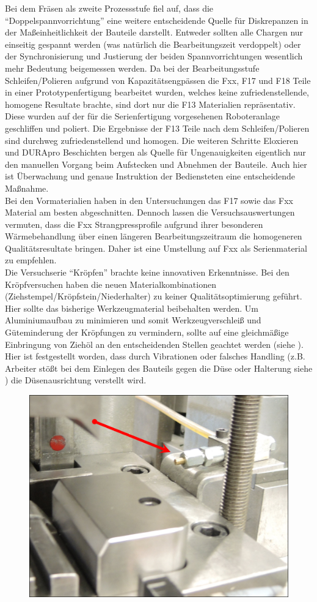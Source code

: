 \documentclass[12pt,a4paper,parskip,twoside,BCOR5mm,headsepline]{scrartcl}
\begin{document}
\begin{description*}
\begin{itemize*}
Bei dem Fräsen als zweite Prozessstufe fiel auf, dass die "`Doppelspannvorrichtung"' eine weitere entscheidende Quelle für Diskrepanzen in der Maßeinheitlichkeit der Bauteile darstellt. Entweder sollten  alle Chargen nur einseitig gespannt werden (was natürlich die Bearbeitungszeit verdoppelt) oder der Synchronisierung und Justierung der beiden Spannvorrichtungen wesentlich mehr Bedeutung  beigemessen  werden. 
Da bei der Bearbeitungsstufe Schleifen/Polieren aufgrund von Kapazitätsengpässen die Fxx, F17 und F18 Teile in einer Prototypenfertigung bearbeitet wurden, welches keine zufriedenstellende, homogene Resultate brachte, sind dort nur die F13 Materialien repräsentativ. Diese wurden auf der für die Serienfertigung vorgesehenen Roboteranlage geschliffen und poliert. Die Ergebnisse der F13 Teile nach dem Schleifen/Polieren sind durchweg zufriedenstellend und homogen. Die weiteren Schritte Eloxieren und DURApro Beschichten bergen als Quelle für Ungenauigkeiten eigentlich nur den manuellen Vorgang beim Aufstecken und Abnehmen der Bauteile. Auch hier ist Überwachung und genaue Instruktion der Bediensteten eine entscheidende Maßnahme. \\
Bei den Vormaterialien haben in den Untersuchungen das F17 sowie das Fxx Material am besten abgeschnitten. Dennoch lassen die Versuchsauswertungen vermuten, dass die Fxx Strangpressprofile aufgrund ihrer besonderen Wärmebehandlung über einen längeren Bearbeitungszeitraum die homogeneren Qualitätsresultate bringen. Daher ist eine Umstellung auf Fxx als Serienmaterial zu empfehlen.\\
Die Versuchserie "`Kröpfen"' brachte keine innovativen Erkenntnisse. Bei den Kröpfversuchen haben die neuen Materialkombinationen (Ziehstempel/Kröpfstein/Niederhalter) zu keiner Qualitätsoptimierung geführt. Hier sollte das bisherige Werkzeugmaterial beibehalten werden. Um Aluminiumaufbau zu minimieren und somit Werkzeugverschleiß und Güteminderung der Kröpfungen  zu vermindern,  sollte auf eine gleichmäßige Einbringung von Ziehöl an den entscheidenden Stellen geachtet werden (siehe ). Hier ist festgestellt worden, dass durch Vibrationen oder falsches Handling (z.B. Arbeiter stößt bei dem Einlegen des Bauteils gegen die Düse oder Halterung siehe ) die Düsenausrichtung verstellt wird.
\begin{figure}[H]
\centering
\includegraphics[width=.8\textwidth]{DueseMittelweit}

\end{figure}
\end{itemize*}
\end{description*}
\end{document}
